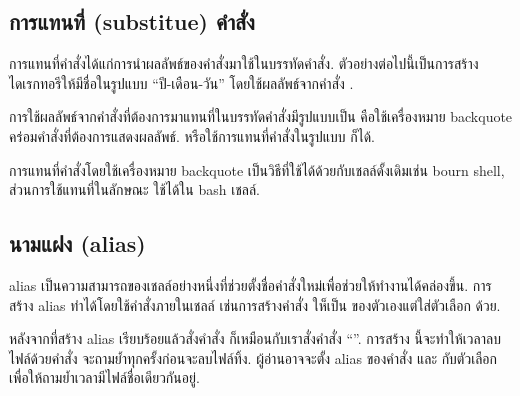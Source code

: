 \begin{thwbr}
\begin{MyExample}
\begin{MyEx}
\end{MyEx}
\end{MyExample}

\subsection{การแทนที่ (substitue) คำสั่ง}\label{sec:substitute}
การแทนที่คำสั่งได้แก่การนำผลลัพธ์ของคำสั่งมาใช้ในบรรทัดคำสั่ง. ตัวอย่างต่อไปนี้เป็นการสร้างไดเรกทอรีให้มีชื่อในรูปแบบ ``ปี-เดือน-วัน'' โดยใช้ผลลัพธ์จากคำสั่ง .
\begin{MyExample}
\end{MyExample}
การใช้ผลลัพธ์จากคำสั่งที่ต้องการมาแทนที่ในบรรทัดคำสั่งมีรูปแบบเป็น  คือใช้เครื่องหมาย backquote คร่อมคำสั่งที่ต้องการแสดงผลลัพธ์. หรือใช้การแทนที่คำสั่งในรูปแบบ  ก็ได้.
\begin{MyExample}
\end{MyExample}

การแทนที่คำสั่งโดยใช้เครื่องหมาย backquote เป็นวิธีที่ใช้ได้ด้วยกับเชลล์ดั้งเดิมเช่น bourn shell, ส่วนการใช้แทนที่ในลักษณะ  ใช้ได้ใน bash เชลล์.




\subsection{นามแฝง (alias)}\label{sec:alias}
alias เป็นความสามารถของเชลล์อย่างหนึ่งที่ช่วยตั้งชื่อคำสั่งใหม่เพื่อช่วยให้ทำงานได้คล่องขึ้น. การสร้าง alias ทำได้โดยใช้คำสั่งภายในเชลล์  เช่นการสร้างคำสั่ง  ให็เป็น  ของตัวเองแต่ใส่ตัวเลือก  ด้วย. 

\begin{MyExample}[สร้าง alias]
\end{MyExample}
หลังจากที่สร้าง alias เรียบร้อยแล้วสั่งคำสั่ง  ก็เหมือนกับเราสั่งคำสั่ง ``''. การสร้าง  นี้จะทำให้เวลาลบไฟล์ด้วยคำสั่ง  จะถามย้ำทุกครั้งก่อนจะลบไฟล์ทิ้ง. ผู้อ่านอาจจะตั้ง alias ของคำสั่ง  และ  กับตัวเลือก  เพื่อให้ถามย้ำเวลามีไฟล์ชื่อเดียวกันอยู่. 


\end{thwbr}
